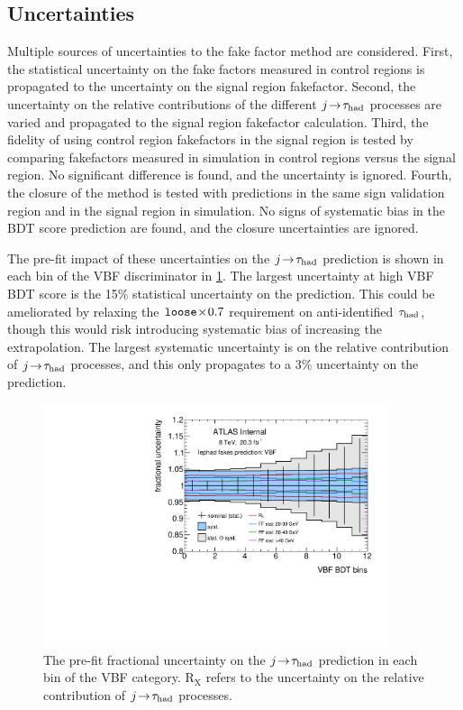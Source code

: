 \subsection{Uncertainties}

Multiple sources of uncertainties to the fake factor method are considered. First, the statistical uncertainty on the fake factors measured in control regions is propagated to the uncertainty on the signal region fakefactor. Second, the uncertainty on the relative contributions of the different $j\!\rightarrow\!\tau_\text{had}$ processes are varied and propagated to the signal region fakefactor calculation. Third, the fidelity of using control region fakefactors in the signal region is tested by comparing fakefactors measured in simulation in control regions versus the signal region. No significant difference is found, and the uncertainty is ignored. Fourth, the closure of the method is tested with predictions in the same sign validation region and in the signal region in simulation. No signs of systematic bias in the BDT score prediction are found, and the closure uncertainties are ignored.

The pre-fit impact of these uncertainties on the $j\!\rightarrow\!\tau_\text{had}$ prediction is shown in each bin of the VBF discriminator in \cref{fig:backgrounds-uncertainties-fakes}. The largest uncertainty at high VBF BDT score is the 15\% statistical uncertainty on the prediction. This could be ameliorated by relaxing the $\texttt{loose}\!\times\!0.7$ requirement on anti-identified $\tau_\text{had}$, though this would risk introducing systematic bias of increasing the extrapolation. The largest systematic uncertainty is on the relative contribution of $j\!\rightarrow\!\tau_\text{had}$ processes, and this only propagates to a 3\% uncertainty on the prediction.

\begin{figure}[tp]
  \includegraphics[width=0.90\textwidth]{figures/uncertainties/uncertainties_lephad_paper14_8TeV_fakes_VBF}
  \caption{The pre-fit fractional uncertainty on the $j\!\rightarrow\!\tau_\text{had}$ prediction in each bin of the VBF category. $\text{R}_\text{X}$ refers to the uncertainty on the relative contribution of $j\!\rightarrow\!\tau_\text{had}$ processes.}
  \label{fig:backgrounds-uncertainties-fakes}
\end{figure}

